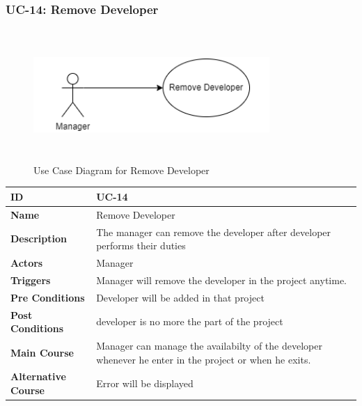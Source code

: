 \newpage

\subsubsection{UC-14: Remove Developer}
\begin{figure}[H]
    \includegraphics[height=5cm, width=0.8\textwidth]{./diagrams/Use Case/u14.png}
    \centering
    \caption{Use Case Diagram for Remove Developer}
    \label{fig:Usecase1}
\end{figure}

\begin{center}
    \begin{tabularx}{\textwidth}{|l|X|}
        \hline
        \textbf{ID}                 & UC-14                                                                                                  \\
        \hline
        \textbf{Name}               & Remove Developer                                                                                       \\
        \hline
        \textbf{Description}        & The manager can remove the developer after developer performs their duties                             \\
        \hline
        \textbf{Actors}             & Manager                                                                                                \\
        \hline
        \textbf{Triggers}           & Manager will remove the developer in the project anytime.                                              \\
        \hline
        \textbf{Pre Conditions}     & Developer will be added in that project                                                                \\
        \hline
        \textbf{Post Conditions}    & developer is no more the part of the project                                                           \\
        \hline
        \textbf{Main Course}        & Manager can manage the availabilty of the developer whenever he enter in the project or when he exits. \\
        \hline
        \textbf{Alternative Course} & Error will be displayed                                                                                \\
        \hline
    \end{tabularx}
\end{center}
\newpage


